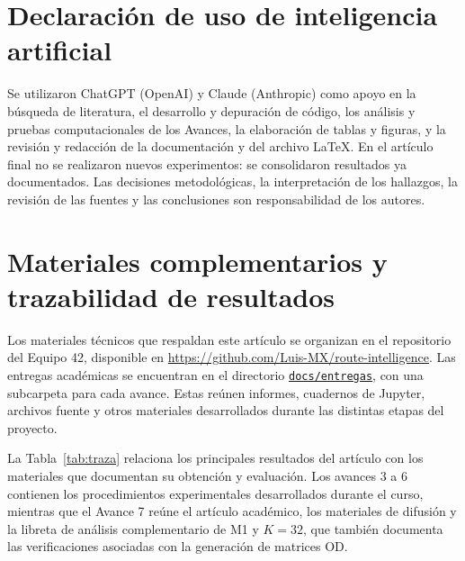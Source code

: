 \documentclass[letterpaper,11pt]{article}
\begin{document}
\section*{Declaración de uso de inteligencia artificial}
Se utilizaron ChatGPT (OpenAI) y Claude (Anthropic) como apoyo en la búsqueda de literatura, el desarrollo y depuración de código, los análisis y pruebas computacionales de los Avances, la elaboración de tablas y figuras, y la revisión y redacción de la documentación y del archivo LaTeX. En el artículo final no se realizaron nuevos experimentos: se consolidaron resultados ya documentados. Las decisiones metodológicas, la interpretación de los hallazgos, la revisión de las fuentes y las conclusiones son responsabilidad de los autores.

{\setlength{\bibitemsep}{0pt}\printbibliography[title={Referencias}]}
\clearpage
\appendix

\section{Materiales complementarios y trazabilidad de resultados}
\label{app:traza}

Los materiales técnicos que respaldan este artículo se organizan en el repositorio del Equipo 42, disponible en \url{https://github.com/Luis-MX/route-intelligence}. Las entregas académicas se encuentran en el directorio \href{https://github.com/Luis-MX/route-intelligence/tree/main/docs/entregas}{\texttt{docs/entregas}}, con una subcarpeta para cada avance. Estas reúnen informes, cuadernos de Jupyter, archivos fuente y otros materiales desarrollados durante las distintas etapas del proyecto.

La Tabla~\ref{tab:traza} relaciona los principales resultados del artículo con los materiales que documentan su obtención y evaluación. Los avances 3 a 6 contienen los procedimientos experimentales desarrollados durante el curso, mientras que el Avance 7 reúne el artículo académico, los materiales de difusión y la libreta de análisis complementario de M1 y $K=32$, que también documenta las verificaciones asociadas con la generación de matrices OD.
\end{document}
